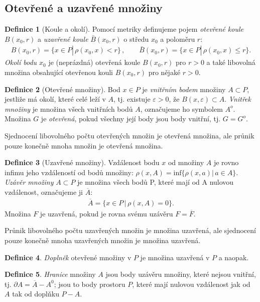 \documentclass[a4]{report}
\theoremstyle{definition}
\newtheorem{definition}{Definice}[section]
\begin{document}
{\subsection{Otevřené a uzavřené množiny}
\begin{definition}[Koule a okolí]
Pomocí metriky definujeme pojem \textit{otevřené koule} $B(x_0,r)$ a \textit{uzavřené koule} $\bar{B}(x_0,r)$ o středu $x_0$ a poloměru $r$:
\begin{align*}
B(x_0,r)=\{x\in P |\, \rho(x_0,x)<r\}\,,\qquad \bar{B}(x_0,r)=\{x\in P |\, \rho(x_0,x)\leq r\}.
\end{align*}
\textit{Okolí bodu $x_0$} je (neprázdná) otevřená koule $B(x_0,r)$  pro $r>0$ a také libovolná množina obsahující otevřenou kouli $B(x_0,r)$ pro nějaké $r>0$.
\end{definition}
\begin{definition}[Otevřené množiny]
Bod $x\in P$ je \textit{vnitřním bodem} množiny $A\subset P$, jestliže má okolí, které celé leží v $A$, tj. existuje $\varepsilon>0$, že $B(x,\varepsilon)\subset A$. \textit{Vnitřek množiny} je množina všech vnitřních bodů $A$, označujeme ho symbolem $A^o$. Množina $G$ je \textit{otevřená}, pokud všechny její body jsou body vnitřní, tj. $G=G^o$.
\end{definition}
Sjednocení libovolného počtu otevřených množin je otevřená množina, ale průnik pouze konečně mnoha množin je  otevřená množina.
\begin{definition}[Uzavřené množiny]
Vzdálenost bodu $x$ od množiny $A$ je rovno infimu jeho vzdáleností od bodů množiny: $\rho(x,A)=\text{inf}\{\rho(x,a)|\,a\in A\}$. \textit{Uzávěr množiny} $A\subset P$ je množina všech bodů P, které mají od A nulovou vzdálenost, označujeme ji $\overline{A}$:
\begin{align*}
\overline{A}=\{x\in P\,|\,\rho(x,A)=0\}.
\end{align*} 
Množina $F$ je uzavřená, pokud je rovna svému uzávěru $F=\overline{F}$.
\end{definition}
Průnik libovolného počtu uzavřených množin je  množina uzavřená, ale sjednocení pouze konečně mnoha uzavřených množin je množina uzavřená.
\begin{definition}
\textit{Doplněk} otevřené množiny v $P$ je množina uzavřená v $P$ a naopak.
\end{definition}
\begin{definition}
\textit{Hranice} množiny $A$ jsou body uzávěru množiny, které nejsou vnitřní, tj. $\partial A=\overline{A}-A^0$; jsou to body prostoru $P$, které mají nulovou vzdálenost jak od $A$ tak od doplňku $P-A$.

\end{definition}}
\end{document}
